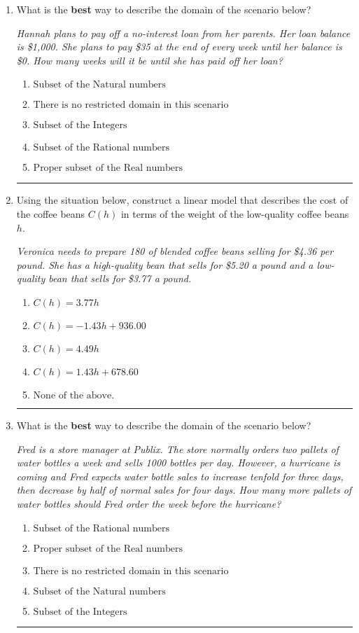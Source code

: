 \documentclass[14pt]{extbook}
\newcommand{\litem}[1]{\item#1\hspace*{-1cm}\rule{\textwidth}{0.4pt}}
\begin{document}
\begin{enumerate}
\litem{
What is the \textbf{best} way to describe the domain of the scenario below?
\begin{center}
    \textit{ Hannah plans to pay off a no-interest loan from her parents. Her loan balance is \$1,000. She plans to pay \$35 at the end of every week until her balance is \$0. How many weeks will it be until she has paid off her loan? }
\end{center}
\begin{enumerate}[label=\Alph*.]
\item \( \text{Subset of the Natural numbers} \)
\item \( \text{There is no restricted domain in this scenario} \)
\item \( \text{Subset of the Integers} \)
\item \( \text{Subset of the Rational numbers} \)
\item \( \text{Proper subset of the Real numbers} \)

\end{enumerate} }
\litem{
Using the situation below, construct a linear model that describes the cost of the coffee beans $C(h)$ in terms of the weight of the low-quality coffee beans $h$.
\begin{center}
    \textit{ Veronica needs to prepare 180 of blended coffee beans selling for \$4.36 per pound. She has a high-quality bean that sells for \$5.20 a pound and a low-quality bean that sells for \$3.77 a pound. }
\end{center}
\begin{enumerate}[label=\Alph*.]
\item \( C(h) = 3.77 h \)
\item \( C(h) = -1.43 h + 936.00 \)
\item \( C(h) = 4.49 h \)
\item \( C(h) = 1.43 h + 678.60 \)
\item \( \text{None of the above.} \)

\end{enumerate} }
\litem{
What is the \textbf{best} way to describe the domain of the scenario below?
\begin{center}
    \textit{ Fred is a store manager at Publix. The store normally orders two pallets of water bottles a week and sells 1000 bottles per day. However, a hurricane is coming and Fred expects water bottle sales to increase tenfold for three days, then decrease by half of normal sales for four days. How many more pallets of water bottles should Fred order the week before the hurricane? }
\end{center}
\begin{enumerate}[label=\Alph*.]
\item \( \text{Subset of the Rational numbers} \)
\item \( \text{Proper subset of the Real numbers} \)
\item \( \text{There is no restricted domain in this scenario} \)
\item \( \text{Subset of the Natural numbers} \)
\item \( \text{Subset of the Integers} \)


\end{enumerate}}
\end{enumerate}
\end{document}
